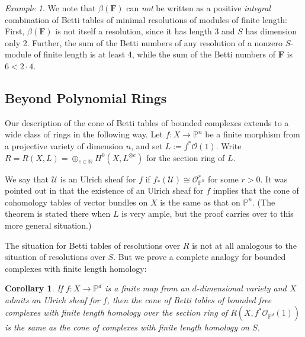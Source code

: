 \documentclass[12pt]{amsart}
\newtheorem{cor}[lemma]{Corollary}
\theoremstyle{definition}
\theoremstyle{remark}
\newtheorem{example}[lemma]{Example}
\newcommand{\PP}{\mathbb{P}}
\newcommand{\cO}{\mathcal{O}}
\newcommand{\cU}{\mathcal{U}}
\newcommand{\FF}{\mathbf{F}}
\newcommand{\defi}[1]{\textsf{#1}} %
\renewcommand{\P}{{\mathbb P}}
\begin{document}
\begin{example}
We note that $\beta(\FF)$ can \emph{not} be written as a positive \emph{integral} combination of Betti tables of minimal resolutions of modules of finite length: First, $\beta(\FF)$ is not itself a resolution, since it has length 3 and $S$ has dimension only 2. 
Further,  the sum of the Betti numbers of any resolution of a nonzero $S$-module of finite length is at least 4, while the sum of the Betti numbers of $\FF$ is $6<2\cdot 4$.
\end{example}



\subsection*{Beyond Polynomial Rings}
Our description of the cone of Betti tables of bounded complexes
extends to a wide class of rings in the following way. Let $f\colon X\to \PP^{n}$ be a finite
morphism from a projective variety of dimension $n$, and set $L:=f^*\cO(1)$. 
Write $R=R(X,L)=\oplus_{e\in \mathbb N} H^0(X,L^{\otimes e})$ for the \defi{section ring}
of $L$.

We say that $\cU$ is an \defi{Ulrich sheaf} for $f$ if $f_*(\cU)\cong \cO_{\PP^n}^r$ for some $r>0$.  It was pointed out in \cite[Theorem~5]{eis-schrey-abel} that the existence of an Ulrich sheaf for $f$ implies that  the cone of cohomology tables of vector bundles on $X$ is the same as that on $\PP^{n}$. (The theorem is stated there when $L$ is very ample, but the proof
carries over to this more general situation.) 

The situation for Betti tables of resolutions over $R$ is not at all analogous to the situation of resolutions over $S$. But we prove a complete analogy for bounded complexes with finite length homology:

\begin{cor}\label{cor:isom cones}
If $f\colon X\to \P^{d}$ is a  finite map from an $d$-dimensional variety and $X$ admits an Ulrich sheaf for $f$, then the cone of Betti tables
of bounded free complexes with finite length homology over  the section ring
of $R(X,f^*\cO_{\PP^d}(1))$ is the same
as the cone of complexes with finite length homology on $S$. 
\end{cor}
\end{document}
